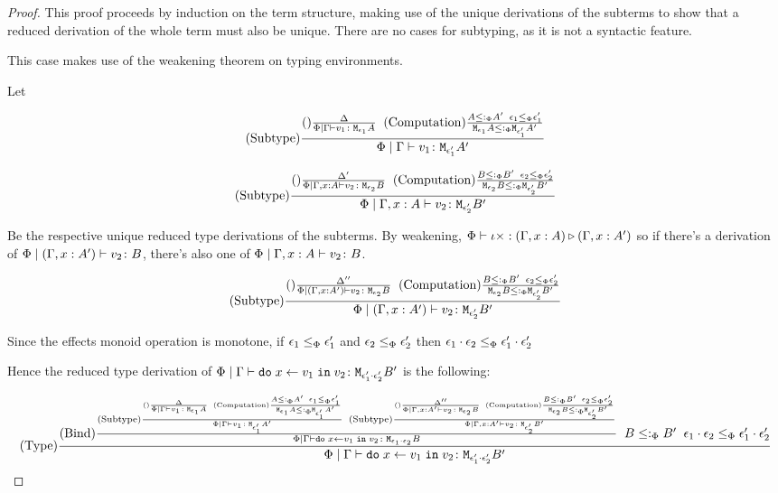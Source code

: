 \documentclass{Report}
\begin{document}
\begin{proof}
    This proof proceeds by induction on the term structure, making use of the unique derivations of the subterms to show that a reduced derivation of the whole term must also be unique. There are no cases for subtyping, as it is not a syntactic feature. 

     This case makes use of the weakening theorem on typing environments.

    Let 

    \begin{equation}
        \edeltacrule{\G}{v_1}{\e_1}{A}{\e_1'}{A'}
    \end{equation}

    \begin{equation}
        \edeltacruleprime{\G, x:A}{v_2}{\e_2}{B}{\e_2'}{B'}
    \end{equation}

    Be the respective unique reduced type derivations of the subterms. By weakening, $\ewrel{\P}{\i\x}{(\G, x:A)}{(\G, x: A')}$ so if there's a derivation of $\etyperelation{\P}{(\G, x:A')}{v_2}{B}$, there's also one of $\etyperelation{\P}{\gax}{v_2}{B}$.

    \begin{equation}
        \edeltacruleprimeprime{(\G, x:A')}{v_2}{\e_2}{B}{\e_2'}{B'}
    \end{equation}

    Since the effects monoid operation is monotone, if $\e_1\subeffectp\e_1'$ and $\e_2\subeffectp\e_2'$ then $\e_1\dot\e_2 \subeffectp \e_1'\dot\e_2'$

    Hence the reduced type derivation of $\gpetyperelation{\doin{x}{v_1}{v_2}}{\M{\e_1'\dot\e_2'}{B'}}$ is the following:

    \begin{equation}
        \treerule{Type} {
            \treerule{Bind}{
                \edeltacrule{\G}{v_1}{\e_1}{A}{\e_1'}{A'}
                \s\s
                \edeltacruleprimeprime{\G, x:A'}{v_2}{\e_2}{B}{\e_2'}{B'}
            } {
                \gpetyperelation{\doin{x}{v_1}{v_2}}{\M{\e_1\dot\e_2}{B}}
            }
            \s\s
            B\subtypep B'
            \s\s
            \e_1\dot\e_2\subeffectp\e_1'\dot\e_2'
        } {
            \gpetyperelation{\doin{x}{v_1}{v_2}}{\M{\e_1'\dot\e_2'}{B'}}
        }
    \end{equation}



\end{proof}
\end{document}
